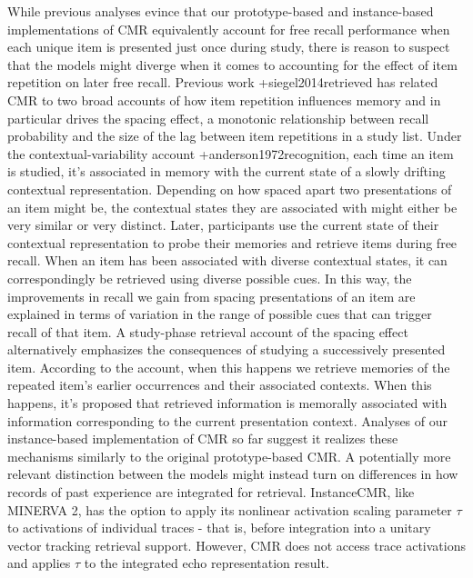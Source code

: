 While previous analyses evince that our prototype-based and instance-based implementations of CMR equivalently account for free recall performance when each unique item is presented just once during study, there is reason to suspect that the models might diverge when it comes to accounting for the effect of item repetition on later free recall.\markdownRendererInterblockSeparator
{}Previous work +{}{}{siegel2014retrieved} has related CMR to two broad accounts of how item repetition influences memory and in particular drives the spacing effect, a monotonic relationship between recall probability and the size of the lag between item repetitions in a study list. Under the contextual-variability account +{}{}{anderson1972recognition}, each time an item is studied, it's associated in memory with the current state of a slowly drifting contextual representation. Depending on how spaced apart two presentations of an item might be, the contextual states they are associated with might either be very similar or very distinct. Later, participants use the current state of their contextual representation to probe their memories and retrieve items during free recall. When an item has been associated with diverse contextual states, it can correspondingly be retrieved using diverse possible cues. In this way, the improvements in recall we gain from spacing presentations of an item are explained in terms of variation in the range of possible cues that can trigger recall of that item. A study-phase retrieval account of the spacing effect alternatively emphasizes the consequences of studying a successively presented item. According to the account, when this happens we retrieve memories of the repeated item's earlier occurrences and their associated contexts. When this happens, it's proposed that retrieved information is memorally associated with information corresponding to the current presentation context.\markdownRendererInterblockSeparator
{}Analyses of our instance-based implementation of CMR so far suggest it realizes these mechanisms similarly to the original prototype-based CMR. A potentially more relevant distinction between the models might instead turn on differences in how records of past experience are integrated for retrieval. InstanceCMR, like MINERVA 2, has the option to apply its nonlinear activation scaling parameter $\tau$ to activations of individual traces - that is, before integration into a unitary vector tracking retrieval support. However, CMR does not access trace activations and applies $\tau$ to the integrated echo representation result.\markdownRendererInterblockSeparator
